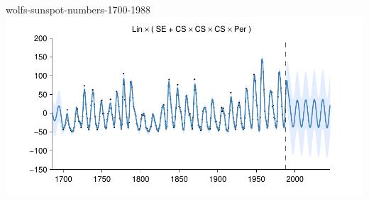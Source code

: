     
\begin{frame}{wolfs-sunspot-numbers-1700-1988}
  \center
  \includegraphics[width=1.0\textwidth]{figures/wolfs-sunspot-numbers-1700-1988/wolfs-sunspot-numbers-1700-1988_all}
\end{frame}  



    
